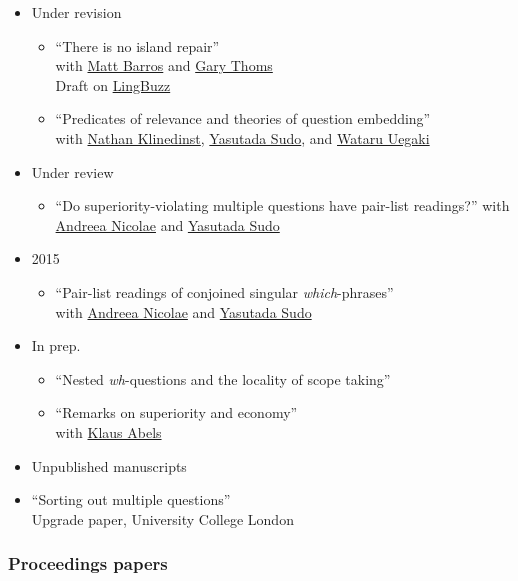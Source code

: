 \documentclass[]{article}
\providecommand{\tightlist}{%
  \setlength{\itemsep}{0pt}\setlength{\parskip}{0pt}}
\begin{document}
\begin{itemize}
\tightlist
\item
  Under revision

  \begin{itemize}
  \tightlist
  \item
    ``There is no island repair''\\
    with \href{...}{Matt Barros} and \href{...}{Gary Thoms}\\
    Draft on \href{http://ling.auf.net/lingbuzz/002100}{LingBuzz}
  \item
    ``Predicates of relevance and theories of question embedding''\\
    with \href{...}{Nathan Klinedinst}, \href{...}{Yasutada Sudo}, and
    \href{...}{Wataru Uegaki}
  \end{itemize}
\item
  Under review

  \begin{itemize}
  \tightlist
  \item
    ``Do superiority-violating multiple questions have pair-list
    readings?'' with \href{...}{Andreea Nicolae} and \href{...}{Yasutada
    Sudo}
  \end{itemize}
\item
  2015

  \begin{itemize}
  \tightlist
  \item
    ``Pair-list readings of conjoined singular \emph{which}-phrases''\\
    with \href{...}{Andreea Nicolae} and \href{...}{Yasutada Sudo}
  \end{itemize}
\item
  In prep.

  \begin{itemize}
  \tightlist
  \item
    ``Nested \emph{wh}-questions and the locality of scope taking''
  \item
    ``Remarks on superiority and economy''\\
    with \href{...}{Klaus Abels}
  \end{itemize}
\item
  Unpublished manuscripts
\item
  ``Sorting out multiple questions''\\
  Upgrade paper, University College London
\end{itemize}

\subsubsection{Proceedings papers}\label{proceedings-papers}
\end{document}
